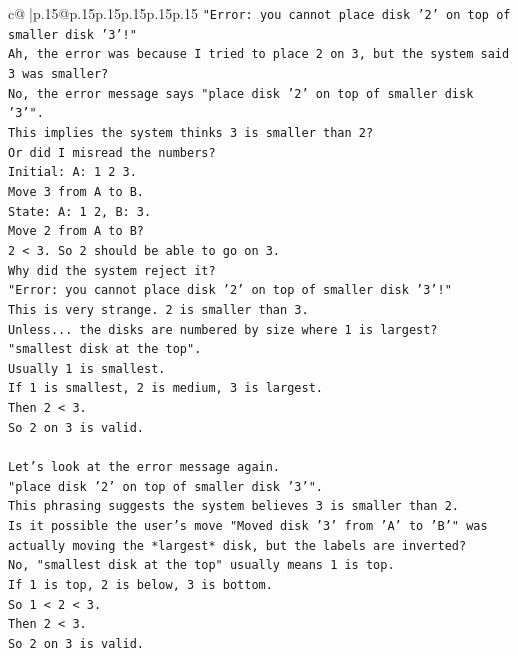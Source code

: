 \documentclass{article}
\begin{document}
{\begin{supertabular}{c@{$\;$}|p{.15\linewidth}@{}p{.15\linewidth}p{.15\linewidth}p{.15\linewidth}p{.15\linewidth}p{.15\linewidth}}
{{{\texttt{"Error: you cannot place disk '2' on top of smaller disk '3'!"} \\
\texttt{Ah, the error was because I tried to place 2 on 3, but the system said 3 was smaller?} \\
\texttt{No, the error message says "place disk '2' on top of smaller disk '3'".} \\
\texttt{This implies the system thinks 3 is smaller than 2?} \\
\texttt{Or did I misread the numbers?} \\
\texttt{Initial: A: 1 2 3.} \\
\texttt{Move 3 from A to B.} \\
\texttt{State: A: 1 2, B: 3.} \\
\texttt{Move 2 from A to B?} \\
\texttt{2 < 3. So 2 should be able to go on 3.} \\
\texttt{Why did the system reject it?} \\
\texttt{"Error: you cannot place disk '2' on top of smaller disk '3'!"} \\
\texttt{This is very strange. 2 is smaller than 3.} \\
\texttt{Unless... the disks are numbered by size where 1 is largest?} \\
\texttt{"smallest disk at the top".} \\
\texttt{Usually 1 is smallest.} \\
\texttt{If 1 is smallest, 2 is medium, 3 is largest.} \\
\texttt{Then 2 < 3.} \\
\texttt{So 2 on 3 is valid.} \\
\\ 
\texttt{Let's look at the error message again.} \\
\texttt{"place disk '2' on top of smaller disk '3'".} \\
\texttt{This phrasing suggests the system believes 3 is smaller than 2.} \\
\texttt{Is it possible the user's move "Moved disk '3' from 'A' to 'B'" was actually moving the *largest* disk, but the labels are inverted?} \\
\texttt{No, "smallest disk at the top" usually means 1 is top.} \\
\texttt{If 1 is top, 2 is below, 3 is bottom.} \\
\texttt{So 1 < 2 < 3.} \\
\texttt{Then 2 < 3.} \\
\texttt{So 2 on 3 is valid.} \\
}}}
\end{supertabular}}
\end{document}
